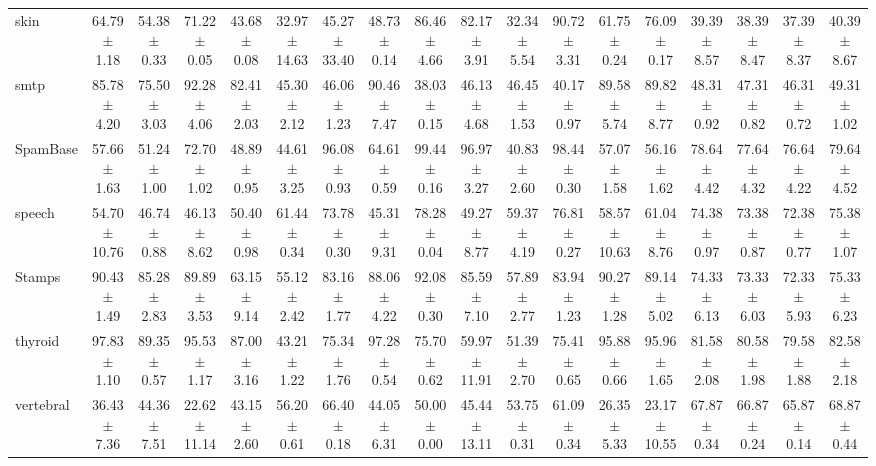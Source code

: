 \begin{table}[ht]
\begin{adjustbox}{max width=\textwidth}
\begin{tabular}{lccccccccccccccccc}
            skin &  64.79 $\pm$ 1.18 &  54.38 $\pm$ 0.33 &  71.22 $\pm$ 0.05 &  43.68 $\pm$ 0.08 & 32.97 $\pm$ 14.63 & 45.27 $\pm$ 33.40 &  48.73 $\pm$ 0.14 & 86.46 $\pm$ 4.66 &  82.17 $\pm$ 3.91 &  32.34 $\pm$ 5.54 &  90.72 $\pm$ 3.31 &  61.75 $\pm$ 0.24 &  76.09 $\pm$ 0.17 &  39.39 $\pm$ 8.57 &  38.39 $\pm$ 8.47 &  37.39 $\pm$ 8.37 &  40.39 $\pm$ 8.67 \\
            smtp &  85.78 $\pm$ 4.20 &  75.50 $\pm$ 3.03 &  92.28 $\pm$ 4.06 &  82.41 $\pm$ 2.03 &  45.30 $\pm$ 2.12 &  46.06 $\pm$ 1.23 &  90.46 $\pm$ 7.47 & 38.03 $\pm$ 0.15 &  46.13 $\pm$ 4.68 &  46.45 $\pm$ 1.53 &  40.17 $\pm$ 0.97 &  89.58 $\pm$ 5.74 &  89.82 $\pm$ 8.77 &  48.31 $\pm$ 0.92 &  47.31 $\pm$ 0.82 &  46.31 $\pm$ 0.72 &  49.31 $\pm$ 1.02 \\
        SpamBase &  57.66 $\pm$ 1.63 &  51.24 $\pm$ 1.00 &  72.70 $\pm$ 1.02 &  48.89 $\pm$ 0.95 &  44.61 $\pm$ 3.25 &  96.08 $\pm$ 0.93 &  64.61 $\pm$ 0.59 & 99.44 $\pm$ 0.16 &  96.97 $\pm$ 3.27 &  40.83 $\pm$ 2.60 &  98.44 $\pm$ 0.30 &  57.07 $\pm$ 1.58 &  56.16 $\pm$ 1.62 &  78.64 $\pm$ 4.42 &  77.64 $\pm$ 4.32 &  76.64 $\pm$ 4.22 &  79.64 $\pm$ 4.52 \\
          speech & 54.70 $\pm$ 10.76 &  46.74 $\pm$ 0.88 &  46.13 $\pm$ 8.62 &  50.40 $\pm$ 0.98 &  61.44 $\pm$ 0.34 &  73.78 $\pm$ 0.30 &  45.31 $\pm$ 9.31 & 78.28 $\pm$ 0.04 &  49.27 $\pm$ 8.77 &  59.37 $\pm$ 4.19 &  76.81 $\pm$ 0.27 & 58.57 $\pm$ 10.63 &  61.04 $\pm$ 8.76 &  74.38 $\pm$ 0.97 &  73.38 $\pm$ 0.87 &  72.38 $\pm$ 0.77 &  75.38 $\pm$ 1.07 \\
          Stamps &  90.43 $\pm$ 1.49 &  85.28 $\pm$ 2.83 &  89.89 $\pm$ 3.53 &  63.15 $\pm$ 9.14 &  55.12 $\pm$ 2.42 &  83.16 $\pm$ 1.77 &  88.06 $\pm$ 4.22 & 92.08 $\pm$ 0.30 &  85.59 $\pm$ 7.10 &  57.89 $\pm$ 2.77 &  83.94 $\pm$ 1.23 &  90.27 $\pm$ 1.28 &  89.14 $\pm$ 5.02 &  74.33 $\pm$ 6.13 &  73.33 $\pm$ 6.03 &  72.33 $\pm$ 5.93 &  75.33 $\pm$ 6.23 \\
         thyroid &  97.83 $\pm$ 1.10 &  89.35 $\pm$ 0.57 &  95.53 $\pm$ 1.17 &  87.00 $\pm$ 3.16 &  43.21 $\pm$ 1.22 &  75.34 $\pm$ 1.76 &  97.28 $\pm$ 0.54 & 75.70 $\pm$ 0.62 & 59.97 $\pm$ 11.91 &  51.39 $\pm$ 2.70 &  75.41 $\pm$ 0.65 &  95.88 $\pm$ 0.66 &  95.96 $\pm$ 1.65 &  81.58 $\pm$ 2.08 &  80.58 $\pm$ 1.98 &  79.58 $\pm$ 1.88 &  82.58 $\pm$ 2.18 \\
       vertebral &  36.43 $\pm$ 7.36 &  44.36 $\pm$ 7.51 & 22.62 $\pm$ 11.14 &  43.15 $\pm$ 2.60 &  56.20 $\pm$ 0.61 &  66.40 $\pm$ 0.18 &  44.05 $\pm$ 6.31 & 50.00 $\pm$ 0.00 & 45.44 $\pm$ 13.11 &  53.75 $\pm$ 0.31 &  61.09 $\pm$ 0.34 &  26.35 $\pm$ 5.33 & 23.17 $\pm$ 10.55 &  67.87 $\pm$ 0.34 &  66.87 $\pm$ 0.24 &  65.87 $\pm$ 0.14 &  68.87 $\pm$ 0.44 \\

\end{tabular}
\end{adjustbox}
\end{table}
